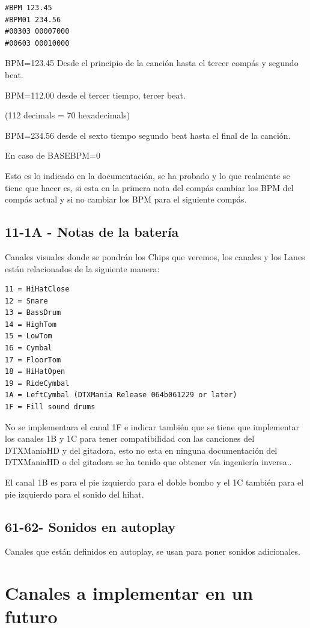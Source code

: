 \documentclass[a4paper,11pt,oneside]{book}
\begin{document}
\begin{Verbatim}[frame=single]
#BPM 123.45
#BPM01 234.56
#00303 00007000
#00603 00010000
\end{Verbatim} 

BPM=123.45 Desde el principio de la canción hasta el tercer compás y segundo beat.

BPM=112.00 desde el tercer tiempo, tercer beat. 

(112 decimals = 70 hexadecimals)

BPM=234.56 desde el sexto tiempo segundo beat hasta el final de la canción.

En caso de BASEBPM=0


Esto es lo indicado en la documentación, se ha probado y lo que realmente se tiene que hacer es, si esta en la primera nota del compás cambiar los BPM del compás actual y si no cambiar los BPM para el siguiente compás.


\subsection{11-1A - Notas de la batería}
Canales visuales donde se pondrán los \gls{Chips} que veremos, los canales y los \gls{Lanes} están relacionados de la siguiente manera:


\begin{Verbatim}[frame=single]
11 = HiHatClose
12 = Snare
13 = BassDrum
14 = HighTom
15 = LowTom
16 = Cymbal
17 = FloorTom
18 = HiHatOpen
19 = RideCymbal
1A = LeftCymbal (DTXMania Release 064b061229 or later)
1F = Fill sound drums
\end{Verbatim} 

No se implementara el canal 1F e indicar también que se tiene que implementar los canales 1B y 1C para tener compatibilidad con las canciones del DTXManiaHD y del gitadora, esto no esta en ninguna documentación del DTXManiaHD o del gitadora se ha tenido que obtener vía ingeniería inversa..

El canal 1B es para el pie izquierdo para el doble bombo y el 1C también para el pie izquierdo para el sonido del hihat.

\subsection{61-62- Sonidos en autoplay}
Canales que están definidos en autoplay, se usan para poner sonidos adicionales.

\section{Canales a implementar en un futuro}
\end{document}

